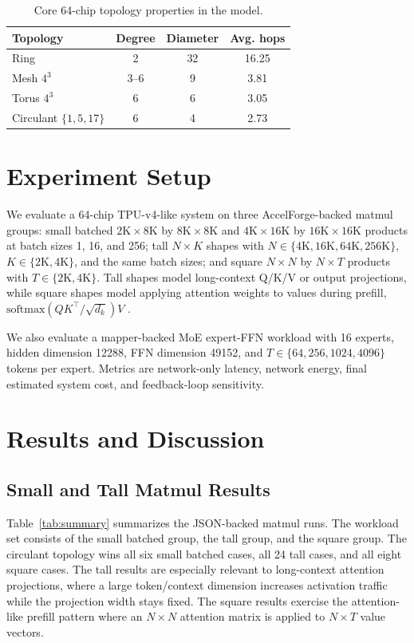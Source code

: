 \documentclass[conference]{IEEEtran}
\begin{document}
\begin{table}[t]
\caption{Core 64-chip topology properties in the model.}
\label{tab:topologies}
\centering
\small
\begin{tabular}{lccc}
\hline
Topology & Degree & Diameter & Avg. hops \\
\hline
Ring & 2 & 32 & 16.25 \\
Mesh $4^3$ & 3--6 & 9 & 3.81 \\
Torus $4^3$ & 6 & 6 & 3.05 \\
Circulant $\{1,5,17\}$ & 6 & 4 & 2.73 \\
\hline
\end{tabular}
\end{table}

\section{Experiment Setup}
We evaluate a 64-chip TPU-v4-like system on three AccelForge-backed matmul
groups: small batched
$2\mathrm{K}\times8\mathrm{K}$ by $8\mathrm{K}\times8\mathrm{K}$ and
$4\mathrm{K}\times16\mathrm{K}$ by $16\mathrm{K}\times16\mathrm{K}$ products at
batch sizes 1, 16, and 256; tall $N\times K$ shapes with
$N\in\{4\mathrm{K},16\mathrm{K},64\mathrm{K},256\mathrm{K}\}$,
$K\in\{2\mathrm{K},4\mathrm{K}\}$, and the same batch sizes; and square
$N\times N$ by $N\times T$ products with $T\in\{2\mathrm{K},4\mathrm{K}\}$.
Tall shapes model long-context Q/K/V or output projections, while square shapes
model applying attention weights to values during prefill,
$\mathrm{softmax}(QK^\top/\sqrt{d_k})V$ \cite{transformer}.

We also evaluate a mapper-backed MoE expert-FFN workload with 16 experts,
hidden dimension 12288, FFN dimension 49152, and
$T\in\{64,256,1024,4096\}$ tokens per expert. Metrics are network-only latency,
network energy, final estimated system cost, and feedback-loop sensitivity.

\section{Results and Discussion}
\subsection{Small and Tall Matmul Results}
Table~\ref{tab:summary} summarizes the JSON-backed matmul runs. The workload
set consists of the small batched group, the tall group, and the square group.
The circulant topology wins all six small batched cases, all 24
tall cases, and all eight square cases. The tall results are especially
relevant to long-context attention projections, where a large token/context
dimension increases activation traffic while the projection width stays fixed.
The square results exercise the attention-like prefill pattern where an
$N\times N$ attention matrix is applied to $N\times T$ value vectors.
\end{document}

